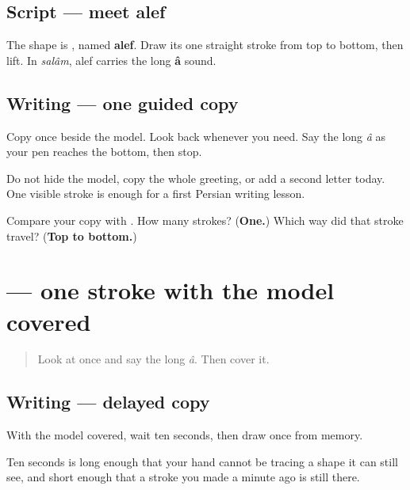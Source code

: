 \subsection*{Script — meet alef}
The shape is \textbf{}, named \textbf{alef}. Draw its one straight stroke from top to bottom, then lift. In \emph{salâm}, alef carries the long \textbf{â} sound.

\subsection*{Writing — one guided copy}

Copy \textbf{} once beside the model. Look back whenever you need. Say the long \emph{â} as your pen reaches the bottom, then stop.

Do not hide the model, copy the whole greeting, or add a second letter today. One visible stroke is enough for a first Persian writing lesson.

\begin{tcolorbox}[breakable,colback=teal!4,colframe=teal!35!black,title={Before you move on}]
Compare your copy with \textbf{}. How many strokes? (\textbf{One.}) Which way did that stroke travel? (\textbf{Top to bottom.})
\end{tcolorbox}
\section[\texorpdfstring{\fa{ا} (alef)}{ا (alef)}]{ — one stroke with the model covered}

\label{lesson:FA-W00-alef-delayed-copy}



\begin{quote}
Look at \textbf{} once and say the long \emph{â}. Then cover it.
\end{quote}

\subsection*{Writing — delayed copy}

With the model covered, wait ten seconds, then draw \textbf{} once from memory.

Ten seconds is long enough that your hand cannot be tracing a shape it can still see, and short enough that a stroke you made a minute ago is still there.

